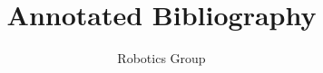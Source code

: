 \documentclass[12pt]{article}
\begin{document}
\title{Annotated Bibliography}
\author{Robotics Group}
\date{}

\maketitle

\nocite{*}



\end{document}
